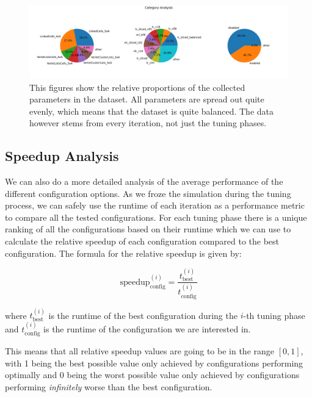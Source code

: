 \begin{figure}[H]
    \centering
    \includegraphics[width=\columnwidth,trim={1cm 2cm 2cm 2cm},clip]{figures/DataAnalytics/traversal_pie_chart.png}
    \caption[Pi Charts of nominal values of the collected Dataset]{ This figures show the relative proportions of the collected parameters in the dataset. All parameters are spread out quite evenly, which means that the dataset is quite balanced. The data however stems from every iteration, not just the tuning phases.}
    \label{fig:inputAnalysisPiChart}
\end{figure}

\subsection{Speedup Analysis}

We can also do a more detailed analysis of the average performance of the different configuration options. As we froze the simulation during the tuning process, we can safely use the runtime of each iteration as a performance metric to compare all the tested configurations. For each tuning phase there is a unique ranking of all the configurations based on their runtime which we can use to calculate the relative speedup of each configuration compared to the best configuration. The formula for the relative speedup is given by:

\begin{equation}
    {\text{speedup}^{(i)}_{\text{config}}}= \frac{t_{\text{best}}^{(i)}}{t_{\text{config}}^{(i)}}
\end{equation}

where $t_{\text{best}}^{(i)}$ is the runtime of the best configuration during the $i$-th tuning phase and $t_{\text{config}}^{(i)}$ is the runtime of the configuration we are interested in.

This means that all relative speedup values are going to be in the range $[0,1]$, with 1 being the best possible value only achieved by configurations performing optimally and 0 being the worst possible value only achieved by configurations performing \emph{infinitely} worse than the best configuration.

